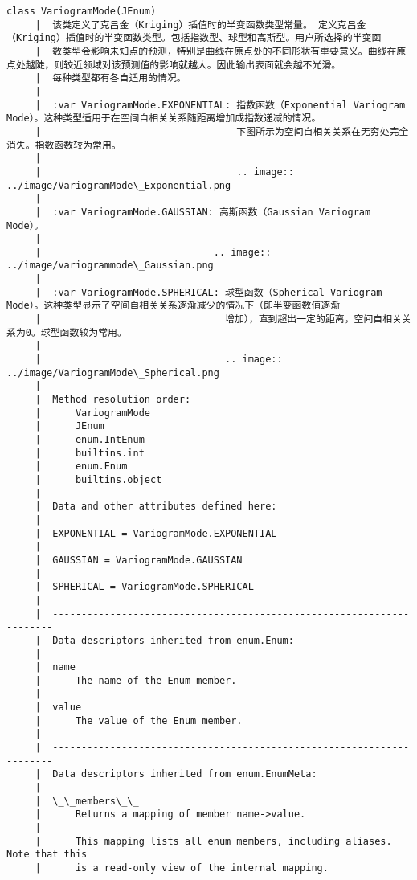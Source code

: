 \documentclass[11pt]{article}
\begin{document}
\begin{Verbatim}[commandchars=\\\{\}]
    class VariogramMode(JEnum)
     |  该类定义了克吕金（Kriging）插值时的半变函数类型常量。 定义克吕金（Kriging）插值时的半变函数类型。包括指数型、球型和高斯型。用户所选择的半变函
     |  数类型会影响未知点的预测，特别是曲线在原点处的不同形状有重要意义。曲线在原点处越陡，则较近领域对该预测值的影响就越大。因此输出表面就会越不光滑。
     |  每种类型都有各自适用的情况。
     |  
     |  :var VariogramMode.EXPONENTIAL: 指数函数（Exponential Variogram Mode）。这种类型适用于在空间自相关关系随距离增加成指数递减的情况。
     |                                  下图所示为空间自相关关系在无穷处完全消失。指数函数较为常用。
     |  
     |                                  .. image:: ../image/VariogramMode\_Exponential.png
     |  
     |  :var VariogramMode.GAUSSIAN: 高斯函数（Gaussian Variogram Mode）。
     |  
     |                              .. image:: ../image/variogrammode\_Gaussian.png
     |  
     |  :var VariogramMode.SPHERICAL: 球型函数（Spherical Variogram Mode）。这种类型显示了空间自相关关系逐渐减少的情况下（即半变函数值逐渐
     |                                增加），直到超出一定的距离，空间自相关关系为0。球型函数较为常用。
     |  
     |                                .. image:: ../image/VariogramMode\_Spherical.png
     |  
     |  Method resolution order:
     |      VariogramMode
     |      JEnum
     |      enum.IntEnum
     |      builtins.int
     |      enum.Enum
     |      builtins.object
     |  
     |  Data and other attributes defined here:
     |  
     |  EXPONENTIAL = VariogramMode.EXPONENTIAL
     |  
     |  GAUSSIAN = VariogramMode.GAUSSIAN
     |  
     |  SPHERICAL = VariogramMode.SPHERICAL
     |  
     |  ----------------------------------------------------------------------
     |  Data descriptors inherited from enum.Enum:
     |  
     |  name
     |      The name of the Enum member.
     |  
     |  value
     |      The value of the Enum member.
     |  
     |  ----------------------------------------------------------------------
     |  Data descriptors inherited from enum.EnumMeta:
     |  
     |  \_\_members\_\_
     |      Returns a mapping of member name->value.
     |      
     |      This mapping lists all enum members, including aliases. Note that this
     |      is a read-only view of the internal mapping.
    

\end{Verbatim}
\end{document}
